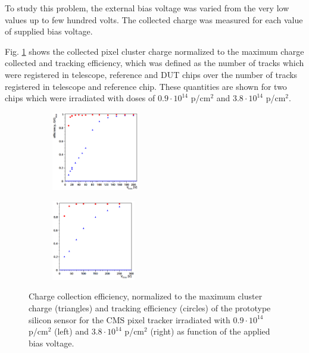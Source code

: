 To study this problem, the external bias voltage was varied from the very low values up to few hundred volts. The collected charge was
measured for each value of supplied bias voltage.

Fig. \ref{fig:depletion_voltage} shows the collected pixel cluster charge normalized to the maximum charge collected and tracking efficiency,
which was defined as the number of tracks which were registered in telescope, reference and DUT chips over the number
of tracks registered in telescope and reference chip.
These quantities are shown for two chips which were irradiated with doses of $0.9 \cdot 10^{14}$ p/cm$^2$ and $3.8 \cdot 10^{14}$ p/cm$^2$. 

\begin{figure}[t]
\centering
\begin{subfigure}
  \centering
  \includegraphics[width=0.42\textwidth]{021_pixel_upgrade/plots/voltage_scan_low_irrad.png}
\end{subfigure}
\begin{subfigure}
  \centering
  \includegraphics[width=0.4\textwidth]{021_pixel_upgrade/plots/voltage_scan_high_irrad.png}
\end{subfigure}
\caption{Charge collection efficiency, normalized to the maximum cluster charge (triangles) and tracking efficiency (circles) of the prototype silicon sensor
         for the CMS pixel tracker irradiated with $0.9 \cdot 10^{14}$ p/cm$^2$ (left) and $3.8 \cdot 10^{14}$ p/cm$^2$ (right) as function of the applied bias voltage.}
\label{fig:depletion_voltage}
\end{figure}


